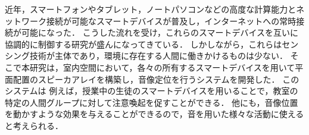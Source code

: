 近年，スマートフォンやタブレット，ノートパソコンなどの高度な計算能力とネットワーク接続が可能なスマートデバイスが普及し，インターネットへの常時接続が可能になった．
こうした流れを受け，これらのスマートデバイスを互いに協調的に制御する研究が盛んになってきている\cite{shibata14}．
しかしながら，これらはセンシング技術が主体であり，環境に存在する人間に働きかけるものは少ない．
そこで本研究は，室内空間において，各々の所有するスマートデバイスを用いて平面配置のスピーカアレイを構築し，音像定位を行うシステムを開発した．
このシステムは
例えば，授業中の生徒のスマートデバイスを用いることで，教室の特定の人間グループに対して注意喚起を促すことができる．
他にも，音像位置を動かすような効果を与えることができるので，音を用いた様々な活動に使えると考えられる．
